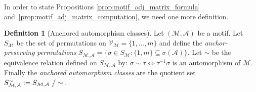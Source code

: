 \documentclass[12pt,draft]{ociamthesis}
\theoremstyle{plain}
\theoremstyle{definition}
\newtheorem{definition}{Definition}[chapter]
\theoremstyle{remark}
\newcommand\ca[1]{\mathcal{#1}}
\begin{document}
In order to state Propositions \ref{prop:motif_adj_matrix_formula}
and~\ref{prop:motif_adj_matrix_computation}, we need one more definition.

\begin{definition}[Anchored automorphism classes]
Let $(\ca{M,A})$ be a motif.
Let $S_\ca{M}$ be the set of permutations on $ \ca{V_M} = \{ 1, \ldots, m \}$
and define the \emph{anchor-preserving permutations} $S_\ca{M,A} = \{ \sigma
\in S_\ca{M} : \{1,m\} \subseteq \sigma(\ca{A}) \}$.
Let $\sim$ be the equivalence relation defined on $S_\ca{M,A}$ by: $\sigma
\sim \tau \iff \tau^{-1} \sigma$ is an automorphism of $\ca{M}$.
Finally the \emph{anchored automorphism classes} are the quotient set
$S_\ca{M,A}^\sim \vcentcolon= S_\ca{M,A} \ \big/ \sim$\,.
\end{definition}
\end{document}
